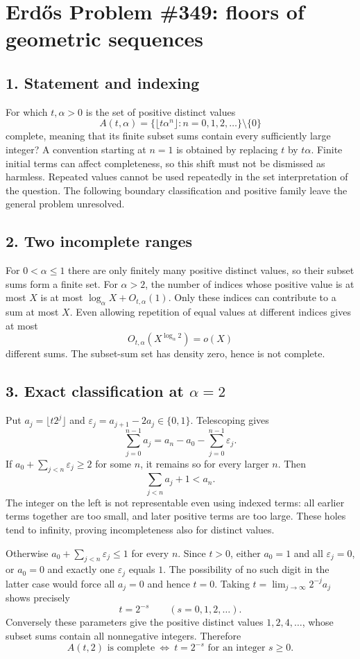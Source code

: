 \section*{Erd\H{o}s Problem \#349: floors of geometric sequences}
\subsection*{1. Statement and indexing}
For which $t,\alpha>0$ is the set of positive distinct values
\[
 A(t,\alpha)=\{\lfloor t\alpha^n\rfloor:n=0,1,2,\ldots\}\setminus\{0\}
\]
complete, meaning that its finite subset sums contain every sufficiently
large integer? A convention starting at $n=1$ is obtained by replacing
$t$ by $t\alpha$. Finite initial terms can affect completeness, so this
shift must not be dismissed as harmless. Repeated values cannot be
used repeatedly in the set interpretation of the question.
The following boundary classification and positive family leave the
general problem unresolved.

\subsection*{2. Two incomplete ranges}
For $0<\alpha\le1$ there are only finitely many positive distinct values,
so their subset sums form a finite set. For $\alpha>2$, the number of
indices whose positive value is at most $X$ is at most
$\log_\alpha X+O_{t,\alpha}(1)$. Only these indices can contribute to
a sum at most $X$. Even allowing repetition of equal values at different
indices gives at most
\[
 O_{t,\alpha}(X^{\log_\alpha 2})=o(X)
\]
different sums. The subset-sum set has density zero, hence is not complete.

\subsection*{3. Exact classification at $\alpha=2$}
Put $a_j=\lfloor t2^j\rfloor$ and
$\varepsilon_j=a_{j+1}-2a_j\in\{0,1\}$. Telescoping gives
\[
 \sum_{j=0}^{n-1}a_j
   =a_n-a_0-\sum_{j=0}^{n-1}\varepsilon_j.          \tag{1}
\]
If $a_0+\sum_{j<n}\varepsilon_j\ge2$ for some $n$, it remains so for
every larger $n$. Then
\[
 \sum_{j<n}a_j+1<a_n.
\]
The integer on the left is not representable even using indexed terms:
all earlier terms together are too small, and later positive terms
are too large. These holes tend to infinity, proving incompleteness
also for distinct values.

Otherwise $a_0+\sum_{j<n}\varepsilon_j\le1$ for every $n$.
Since $t>0$, either $a_0=1$ and all $\varepsilon_j=0$, or $a_0=0$
and exactly one $\varepsilon_j$ equals $1$.
The possibility of no such digit in the latter case would force
all $a_j=0$ and hence $t=0$.
Taking $t=\lim_{j\to\infty}2^{-j}a_j$ shows precisely
\[
 t=2^{-s}\qquad(s=0,1,2,\ldots).
\]
Conversely these parameters give the positive distinct values
$1,2,4,\ldots$, whose subset sums contain all nonnegative integers.
Therefore
\[
 \boxed{A(t,2)\text{ is complete}\ \Longleftrightarrow\
                   t=2^{-s}\text{ for an integer }s\ge0.}
\]

